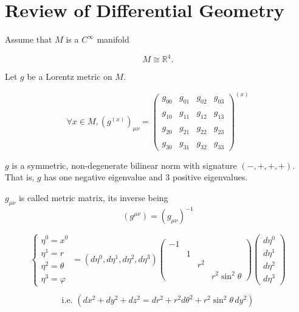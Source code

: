\section{Review of Differential Geometry}
Assume that \( M \) is a \( C^\infty \) manifold

\[M \cong \mathbb{R}^4.\]

Let \( g \) be a Lorentz metric on \( M \).

\[\forall x \in M, \left( g^{(x)} \right)_{\mu\nu} = 
\begin{pmatrix}
g_{00} & g_{01} & g_{02} & g_{03} \\ \\
g_{10} &g_{11}  &g_{12}  & g_{13} \\ \\
g_{20} & g_{21} & g_{22}& g_{23} \\ \\
g_{30} &g_{31}  & g_{32} & g_{33}
\end{pmatrix}^{(x)}\]

\( g \) is a symmetric, non-degenerate bilinear norm with signature \((-,+,+,+)\). 
That is, $g$ has one negative eigenvalue and $3$ positive eigenvalues.


$g_{\mu\nu}$ is called metric matrix, its inverse being
\[ (g^{\mu\nu}) = (g_{\mu\nu})^{-1} \]

\begin{example}
    \[\begin{cases} 
\eta^0 = x^0 \\ 
\eta^1 = r \\ 
\eta^2 = \theta \\ 
\eta^3 = \varphi 
\end{cases} 
= (d\eta^0, d\eta^1,d\eta^2,d\eta^3) 
\begin{pmatrix} 
-1&&& \\ 
&1&& \\ 
&&r^2& \\ 
&&&r^2 \sin^2\theta 
\end{pmatrix} 
\begin{pmatrix} 
d\eta^0 \\ 
d\eta^1 \\ 
d\eta^2\\
d\eta^3
\end{pmatrix}\]

\[\text{i.e. }(dx^2 + dy^2 + dz^2 = dr^2 + r^2 d\theta^2 + r^2 \sin^2\theta \, dy^2)\]

\end{example}

